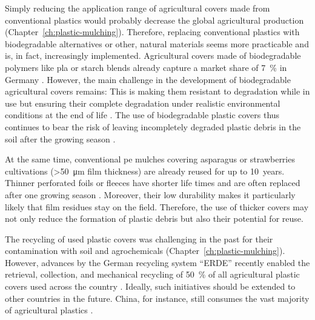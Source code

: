 Simply reducing the application range of agricultural covers made from conventional plastics would probably decrease the global agricultural production (Chapter~\ref{ch:plastic-mulching}). Therefore, replacing conventional plastics with biodegradable alternatives or other, natural materials seems more practicable \citep{BrandesMikro2020} and is, in fact, increasingly implemented. Agricultural covers made of biodegradable polymers like \ac{pla} or starch blends already capture a market share of \SI{7}{\percent} in Germany \citep{BertlingKunststoffe2021}. However, the main challenge in the development of biodegradable agricultural covers remains: This is making them resistant to degradation while in use but ensuring their complete degradation under realistic environmental conditions at the end of life \citep[Chapter~\ref{ch:plastic-mulching};][]{BertlingKunststoffe2021}. The use of biodegradable plastic covers thus continues to bear the risk of leaving incompletely degraded plastic debris in the soil after the growing season \citep{SanderBiodegradation2019,VieraAre2021}.

At the same time, conventional \ac{pe} mulches covering asparagus or strawberries cultivations (\SI{>50}{\micro\meter} film thickness) are already reused for up to \num{10}~years. Thinner perforated foils or fleeces have shorter life times and are often replaced after one growing season \citep[Chapter~\ref{ch:screening};][]{BertlingKunststoffe2021}. Moreover, their low durability makes it particularly likely that film residues stay on the field. Therefore, the use of thicker covers may not only reduce the formation of plastic debris but also their potential for reuse.

The recycling of used plastic covers was challenging in the past for their contamination with soil and agrochemicals (Chapter~\ref{ch:plastic-mulching}). However, advances by the German recycling system ``ERDE'' recently enabled the retrieval, collection, and mechanical recycling of \SI{50}{\percent} of all agricultural plastic covers used across the country \citep{BertlingKunststoffe2021,ERDERecyclingERDE2021}. Ideally, such initiatives should be extended to other countries in the future. China, for instance, still consumes the vast majority of agricultural plastics \citep[Chapter~\ref{ch:plastic-mulching};][]{MormileWorld2017}.

